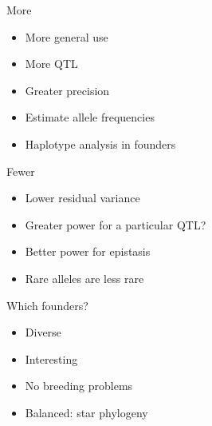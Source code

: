 \documentclass[12pt]{article}
\newcommand{\headsize}{\fontsize{35}{35} \selectfont}
\newcommand{\smallsize}{\fontsize{25}{30} \selectfont}
\begin{document}
{\begin{minipage}[t]{4.8in}
\hspace*{0.5in} {\color{myblue} \smallsize More}

\vspace{6mm}

\begin{itemize}
\itemsep16pt
\item More general use
\item More QTL
\item Greater precision
\item Estimate allele frequencies
\item Haplotype analysis in founders
\end{itemize}

\end{minipage}
\hfill
\begin{minipage}[t]{4.8in}
\vspace*{0mm}

\hspace*{0.5in} {\color{myblue} \smallsize Fewer}

\vspace{6mm}

\begin{itemize}
\itemsep16pt
\item Lower residual variance
\item Greater power for a particular QTL?
\item Better power for epistasis
\item Rare alleles are less rare
\end{itemize}

\end{minipage}

\newpage


\headsize \color{myyellow}
\hfill \begin{minipage}{5.75in}
\centering
Which founders?
\end{minipage}

\vspace{35mm}

\color{mywhite}
\smallsize

\hfill \begin{minipage}{9.5in}
\begin{itemize}
\itemsep24pt
\item Diverse
\item Interesting
\item No breeding problems
\item Balanced: star phylogeny
\end{itemize}
\end{minipage}


}
\end{document}
